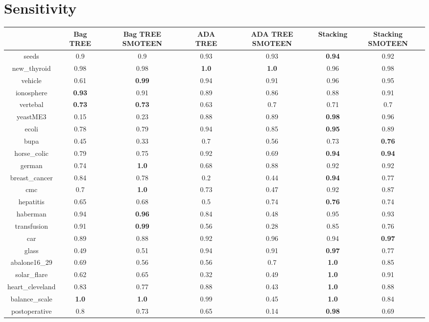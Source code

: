 \documentclass{article}%
\begin{document}
\section*{Sensitivity}%
\begin{tabular}{c|cccccc}%
&Bag TREE&Bag TREE SMOTEEN&ADA TREE&ADA TREE SMOTEEN&Stacking&Stacking SMOTEEN\\%
\hline%
seeds&0.9&0.9&0.93&0.93&\textbf{0.94}&0.92\\%
new\_thyroid&0.98&0.98&\textbf{1.0}&\textbf{1.0}&0.96&0.98\\%
vehicle&0.61&\textbf{0.99}&0.94&0.91&0.96&0.95\\%
ionosphere&\textbf{0.93}&0.91&0.89&0.86&0.88&0.91\\%
vertebal&\textbf{0.73}&\textbf{0.73}&0.63&0.7&0.71&0.7\\%
yeastME3&0.15&0.23&0.88&0.89&\textbf{0.98}&0.96\\%
ecoli&0.78&0.79&0.94&0.85&\textbf{0.95}&0.89\\%
bupa&0.45&0.33&0.7&0.56&0.73&\textbf{0.76}\\%
horse\_colic&0.79&0.75&0.92&0.69&\textbf{0.94}&\textbf{0.94}\\%
german&0.74&\textbf{1.0}&0.68&0.88&0.92&0.92\\%
breast\_cancer&0.84&0.78&0.2&0.44&\textbf{0.94}&0.77\\%
cmc&0.7&\textbf{1.0}&0.73&0.47&0.92&0.87\\%
hepatitis&0.65&0.68&0.5&0.74&\textbf{0.76}&0.74\\%
haberman&0.94&\textbf{0.96}&0.84&0.48&0.95&0.93\\%
transfusion&0.91&\textbf{0.99}&0.56&0.28&0.85&0.76\\%
car&0.89&0.88&0.92&0.96&0.94&\textbf{0.97}\\%
glass&0.49&0.51&0.94&0.91&\textbf{0.97}&0.77\\%
abalone16\_29&0.69&0.56&0.56&0.7&\textbf{1.0}&0.85\\%
solar\_flare&0.62&0.65&0.32&0.49&\textbf{1.0}&0.91\\%
heart\_cleveland&0.83&0.77&0.88&0.43&\textbf{1.0}&0.88\\%
balance\_scale&\textbf{1.0}&\textbf{1.0}&0.99&0.45&\textbf{1.0}&0.84\\%
postoperative&0.8&0.73&0.65&0.14&\textbf{0.98}&0.69\\%
\end{tabular}

%
\end{document}
